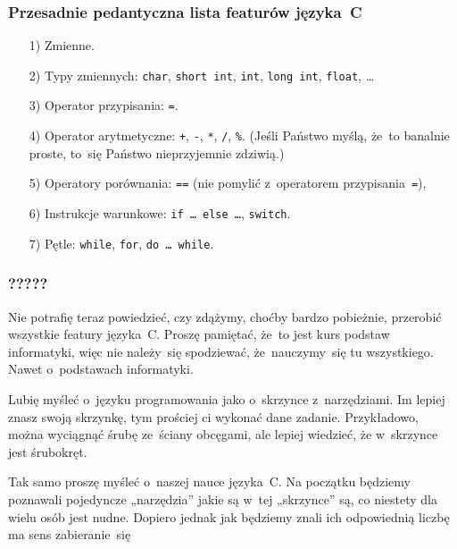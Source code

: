 \documentclass[10pt,t]{beamer}
\begin{document}
\begin{frame}
  \frametitle{Przesadnie pedantyczna lista featurów języka~C}


  \begin{itemize}

  \item[1)] Zmienne.

  \item[2)] Typy zmiennych: \texttt{char}, \texttt{short int}, \texttt{int},
    \texttt{long int}, \texttt{float}, \ldots

  \item[3)] Operator przypisania: \texttt{=}.

  \item[4)] Operator arytmetyczne: \texttt{+}, \texttt{-}, \texttt{*},
    \texttt{/}, \texttt{\%}.
    (Jeśli Państwo myślą, że~to banalnie proste, to~się Państwo
    nieprzyjemnie zdziwią.)

  \item[5)] Operatory porównania: \texttt{==} (nie pomylić z~operatorem
    przypisania~\texttt{=}),



  \item[6)] Instrukcje warunkowe: \texttt{if \ldots{} else \ldots}, \texttt{switch}.



  \item[7)] Pętle: \texttt{while}, \texttt{for}, \texttt{do \ldots{} while}.

  \end{itemize}

\end{frame}





\begin{frame}
  \frametitle{?????}


  Nie potrafię teraz powiedzieć, czy zdążymy, choćby bardzo pobieżnie,
  przerobić \alert{wszystkie} featury języka~C. Proszę pamiętać, że~to jest
  kurs \alert{podstaw informatyki}, więc nie należy~się spodziewać,
  że~nauczymy~się tu wszystkiego. Nawet o~podstawach informatyki.

  Lubię myśleć o~języku programowania jako o~skrzynce z~narzędziami.
  Im lepiej znasz swoją skrzynkę, tym prościej ci wykonać dane zadanie.
  Przykładowo, można wyciągnąć śrubę ze~ściany obcęgami, ale lepiej
  wiedzieć, że w~skrzynce jest śrubokręt.

  Tak samo proszę myśleć o~naszej nauce języka~C. Na początku będziemy
  poznawali pojedyncze „narzędzia” jakie są w~tej „skrzynce” są, co niestety
  dla wielu osób jest nudne. Dopiero jednak jak będziemy znali ich
  odpowiednią liczbę ma sens zabieranie~się

\end{frame}
\end{document}
